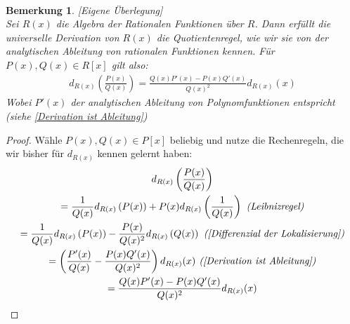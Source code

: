 \documentclass[10pt,a4paper]{report}
\newcommand{\comment}[1]{}
\newcounter{Aussage}[chapter]
\newtheorem{bem}[Aussage]{Bemerkung}
\newcommand{\divf}[1]{d_{#1}}
\begin{document}
\ \\
\begin{bem}\comment{\label{Derivation erfuellt Quotientenregel}}\textit{[Eigene Überlegung]}\\
Sei $R(x)$ die Algebra der Rationalen Funktionen über $R$. Dann erfüllt die universelle Derivation von $R(x)$ die Quotientenregel, wie wir sie von der analytischen Ableitung von rationalen Funktionen kennen. Für $P(x),Q(x) \in R[x]$ gilt also:
\begin{gather*}
\divf{R(x)} \left( \frac{P(x)}{Q(x)} \right) = \frac{Q(x)P'(x) - P(x)Q'(x)}{Q(x)^2} \divf{R(x)}(x)
\end{gather*}
Wobei $P'(x)$ der analytischen Ableitung von Polynomfunktionen entspricht \textit{(siehe \cref{Derivation ist Ableitung})}
\end{bem}
\begin{proof}
Wähle $P(x), Q(x) \in P[x]$ beliebig und nutze die Rechenregeln, die wir bisher für $\divf{R(x)}$ kennen gelernt haben:
\begin{gather*}
\divf{R(x)} \left( \frac{P(x)}{Q(x)} \right)\\
= \frac{1}{Q(x)}\divf{R(x)} \left( P(x) \right) + P(x)\divf{R(x)} \left( \frac{1}{Q(x)} \right) \textit{ (Leibnizregel)}\\
= \frac{1}{Q(x)}\divf{R(x)} \left( P(x) \right) - \frac{P(x)}{Q(x)^2}\divf{R(x)} \left( Q(x) \right) \textit{ (\cref{Differenzial der Lokalisierung})}\\
= \left( \frac{P'(x)}{Q(x)} - \frac{P(x)Q'(x)}{Q(x)^2} \right)\divf{R(x)} (x) \textit{ (\cref{Derivation ist Ableitung})}\\
= \frac{Q(x)P'(x) - P(x)Q'(x)}{Q(x)^2} \divf{R(x)}(x)
\end{gather*}
\end{proof}
\end{document}
